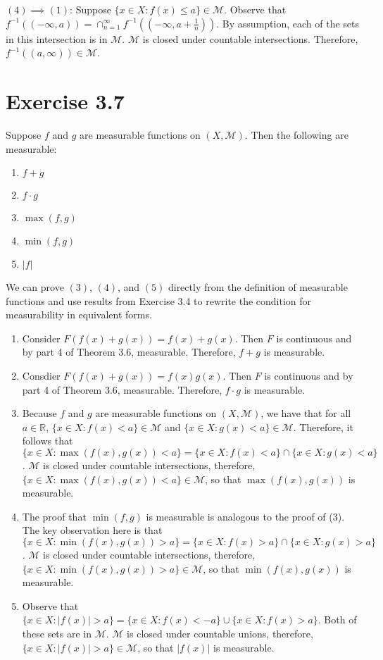 \documentclass{article}
\begin{document}
      $(4) \implies (1)$: Suppose $\{x \in X : f(x) \leq a \} \in \mathcal{M}$. Observe that $f^{-1}((-\infty, a)) = \cap_{n=1}^{\infty} f^{-1}((-\infty, a + \frac{1}{n}))$.
      By assumption, each of the sets in this intersection is in $\mathcal{M}$. $\mathcal{M}$
      is closed under countable intersections. Therefore, $f^{-1}((a, \infty)) \in \mathcal{M}$.



    \section*{Exercise 3.7}
    Suppose $f$ and $g$ are measurable functions on $(X,\mathcal{M})$. Then the following are measurable:
    \begin{enumerate}
    	\item $f + g$
    	\item $f \cdot g$
    	\item $\max(f,g)$
    	\item $\min(f,g)$
    	\item $|f|$
    \end{enumerate}

    We can prove $(3)$, $(4)$, and $(5)$ directly from the definition of measurable functions and use results from Exercise 3.4 to rewrite the condition for measurability in equivalent forms.

    \begin{enumerate}
      \item Consider $F(f(x) + g(x)) = f(x) + g(x)$. Then $F$ is continuous and by part 4 of Theorem 3.6, measurable. Therefore, $f + g$ is measurable.
      \item Consdier $F(f(x) + g(x)) = f(x)g(x)$. Then $F$ is continuous and by part 4 of Theorem 3.6, measurable. Therefore, $f \cdot g$ is measurable.
      \item Because $f$ and $g$ are measurable functions on $(X,\mathcal{M})$, we have that for all $a \in \mathbb{R}$, $\{x \in X : f(x) < a \} \in \mathcal{M}$ and $\{x \in X : g(x) < a \} \in \mathcal{M}$. Therefore, it follows that $\{x \in X : \max(f(x),g(x)) < a \} = \{x \in X : f(x) < a \} \cap \{x \in X : g(x) < a \}$. $\mathcal{M}$
      is closed under countable intersections, therefore, $\{x \in X : \max(f(x),g(x)) < a \} \in \mathcal{M}$, so that $\max(f(x), g(x))$ is measurable.
      \item The proof that $\min(f,g)$ is measurable is analogous to the proof of (3). The key observation here is that $\{x \in X : \min(f(x),g(x)) > a \} = \{x \in X : f(x) > a \} \cap \{x \in X : g(x) > a \}$. $\mathcal{M}$ is closed under countable intersections, therefore, $\{x \in X : \min(f(x),g(x)) > a \} \in \mathcal{M}$, so that $\min(f(x), g(x))$ is measurable.
      \item Observe that $\{x \in X : |f(x)| > a \} = \{x \in X : f(x) < -a \} \cup \{x \in X : f(x) > a \}$. Both of these sets are in $\mathcal{M}$. $\mathcal{M}$ is closed under countable unions, therefore, $\{x \in X : |f(x)| > a \} \in \mathcal{M}$, so that $|f(x)|$ is measurable.
    \end{enumerate}
\end{document}
